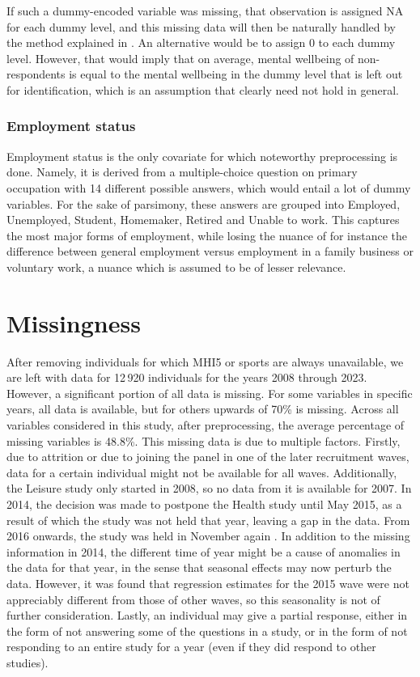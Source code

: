 If such a dummy-encoded variable was missing, that observation is assigned NA for each dummy level, and this missing
data will then be naturally handled by the method explained in .
An alternative would be to assign 0 to each dummy level. However, that would imply that on average, mental wellbeing of non-respondents
is equal to the mental wellbeing in the dummy level that is left out for identification, which is an assumption that
clearly need not hold in general.

\subsubsection{Employment status}
\label{sec:data:preprocessing:employment}
Employment status is the only covariate for which noteworthy preprocessing is done.
Namely, it is derived from a multiple-choice question on primary occupation with 14 different possible answers,
which would entail a lot of dummy variables.
For the sake of parsimony, these answers are grouped into Employed, Unemployed, Student, Homemaker, Retired and
Unable to work. This captures the most major forms of employment, while losing the nuance of for instance
the difference between general employment versus employment in a family business or voluntary work, a nuance which
is assumed to be of lesser relevance.

\section{Missingness}
\label{sec:data:missingness}
After removing individuals for which MHI5 or sports are always unavailable, we are left with data for 12\,920 individuals
for the years 2008 through 2023.
However, a significant portion of all data is missing. For some variables in specific years, all data is available,
but for others upwards of 70\% is missing. Across all variables considered in this study, after preprocessing,
the average percentage of missing variables is 48.8\%.
This missing data is due to multiple factors. Firstly, due to attrition or due to joining the panel
in one of the later recruitment waves, data for a certain individual might not be available for all waves.
Additionally, the Leisure study only started in 2008, so no data from it is available for 2007.
In 2014, the decision was made to postpone the Health study until May 2015, as a result of which the study was not held
that year, leaving a gap in the data. From 2016 onwards, the study was held in November again \cite{marchand2025personal}.
In addition to the missing information in 2014, the different time of year might be a cause of anomalies in the data
for that year, in the sense that seasonal effects may now perturb the data.
However, it was found that regression estimates for the 2015 wave were not appreciably different from those
of other waves, so this seasonality is not of further consideration.
Lastly, an individual may give a partial response, either in the form of not answering some of the questions in a study,
or in the form of not responding to an entire study for a year (even if they did respond to other studies).

